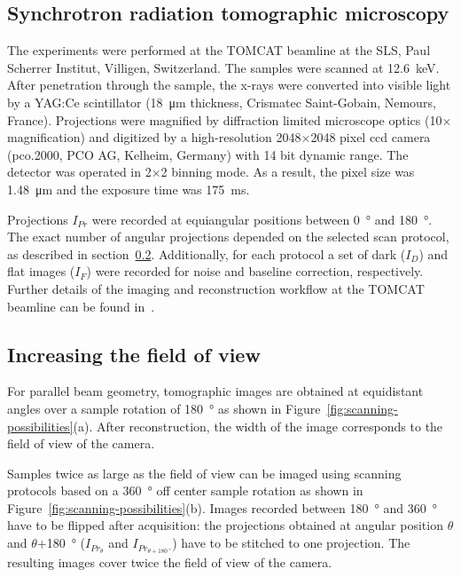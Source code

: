 \subsection{Synchrotron radiation tomographic microscopy}
The experiments were performed at the \ac{TOMCAT} beamline at the \acl{SLS}, Paul Scherrer Institut, Villigen, Switzerland. The samples were scanned at \SI{12.6}{\kilo\electronvolt}. After penetration through the sample, the x-rays were converted into visible light by a YAG:Ce scintillator (\SI{18}{\micro\meter} thickness, Crismatec Saint-Gobain, Nemours, France). Projections were magnified by diffraction limited microscope optics (10$\times$ magnification) and digitized by a high-resolution 2048$\times$2048 pixel \ac{ccd} camera (pco.2000, PCO AG, Kelheim, Germany) with 14 bit dynamic range. The detector was operated in 2$\times$2 binning mode. As a result, the pixel size was \SI{1.48}{\micro\meter} and the exposure time was \SI{175}{\milli\second}.

Projections $I_{Pr}$ were recorded at equiangular positions between \SI{0}{\degree} and \SI{180}{\degree}. The exact number of angular projections depended on the selected scan protocol, as described in section~\ref{subsec:increasing the field of view}. Additionally, for each protocol a set of dark ($I_{D}$) and flat images ($I_{F}$) were recorded for noise and baseline correction, respectively. Further details of the imaging and reconstruction workflow at the \ac{TOMCAT} beamline can be found in~\cite{Hintermueller2010}.

\subsection{Increasing the field of view}\label{subsec:increasing the field of view}
For parallel beam geometry, tomographic images are obtained at equidistant angles over a sample rotation of \SI{180}{\degree} as shown in Figure~\ref{fig:scanning-possibilities}(a). After reconstruction, the width of the image corresponds to the field of view of the camera.

Samples twice as large as the field of view can be imaged using scanning protocols based on a \SI{360}{\degree} off center sample rotation as shown in Figure~\ref{fig:scanning-possibilities}(b). Images recorded between \SI{180}{\degree} and \SI{360}{\degree} have to be flipped after acquisition: the projections obtained at angular position $\theta$ and $\theta$+\SI{180}{\degree} ($I_{Pr_{\theta}}$ and $I_{Pr_{\theta+\SI{180}{\degree}}}$) have to be stitched to one projection. The resulting images cover twice the field of view of the camera.

